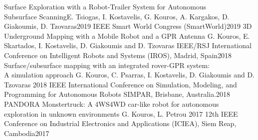 \documentclass[
	a4paper,
	maincolor=cvblue,
	sectioncolor=cvblue,
	profilepicborderwidth=3.0pt,
]{fortysecondscv}
\begin{document}
\begin{cvtable}
	\cvpubitem
	{\small Surface Exploration with a Robot-Trailer System for Autonomous \\ Subsurface Scanning}{\small E. Tsiogas, I. Kostavelis, G. Kouros, A. Kargakos, D. Giakoumis, D. Tzovaras}{\small 2019 IEEE Smart World Congress (SmartWorld)}{2019}
	\cvpubitem
	{\small 3D Underground Mapping with a Mobile Robot and a GPR Antenna}
	{\small G. Kouros, E. Skartados, I. Kostavelis, D. Giakoumis and D. Tzovaras}
	{\small IEEE/RSJ International Conference on Intelligent Robots and Systems (IROS), Madrid, Spain}{2018}
	\cvpubitem
	{\small Surface/subsurface mapping with an integrated rover-GPR system:\\ A simulation approach}
	{\small G. Kouros, C. Psarras, I. Kostavelis, D. Giakoumis and D. Tzovaras}
	{\small 2018 IEEE International Conference on Simulation, Modeling, and Programming for Autonomous Robots SIMPAR, Brisbane, Australia.}{2018}
	\cvpubitem
	{\small PANDORA Monstertruck: A 4WS4WD car-like robot for autonomous\\ exploration in unknown environments}
	{\small G. Kouros, L. Petrou}
	{\small 2017 12th IEEE Conference on Industrial Electronics and Applications (ICIEA), Siem Reap, Cambodia}{2017}
\end{cvtable}


\begin{cvtable}
\end{cvtable}
\end{document}
